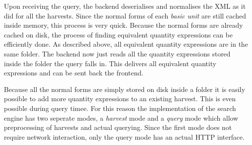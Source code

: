 Upon receiving the query, the backend deserialises and normalises the XML as it did for all the harvests. Since the normal forms of each \textit{basic unit} are still cached inside memory, this process is very quick. Because the normal forms are already cached on disk, the process of finding equivalent quantity expressions can be efficiently done. As described above, all equivalent quantity expressions are in the same folder. The backend now just reads all the quantity expressions stored inside the folder the query falls in. This delivers all equivalent quantity expressions and can be sent back the frontend.

Because all the normal forms are simply stored on disk inside a folder it is easily possible to add more quantity expressions to an existing harvest. This is even possible during query timee. For this reason the implementation of the search engine has two seperate modes, a \textit{harvest} mode and a \textit{query} mode which allow preprocessing of harvests and actual querying. Since the first mode does not require network interaction, only the query mode has an actual HTTP interface.
